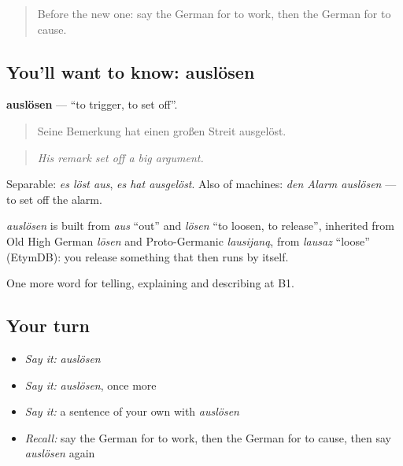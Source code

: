\begin{quote}
Before the new one: say the German for to work, then the German for to cause.
\end{quote}

\subsection*{You'll want to know: auslösen}
\textbf{auslösen} — \textquotedblleft{}to trigger, to set off\textquotedblright{}.

\begin{quote}
Seine Bemerkung hat einen großen Streit ausgelöst.
\end{quote}

\begin{quote}
\emph{His remark set off a big argument.}
\end{quote}

Separable: \emph{es löst aus}, \emph{es hat ausgelöst}. Also of machines: \emph{den Alarm auslösen} — to set off the alarm.

\begin{cousinweb}
\emph{auslösen} is built from \emph{aus} \textquotedblleft{}out\textquotedblright{} and \emph{lösen} \textquotedblleft{}to loosen, to release\textquotedblright{}, inherited from Old High German \emph{lōsen} and Proto-Germanic \emph{lausijaną}, from \emph{lausaz} \textquotedblleft{}loose\textquotedblright{} (EtymDB): you release something that then runs by itself.
\end{cousinweb}

\begin{grammarlens}[title={What you've built}]
One more word for telling, explaining and describing at B1.
\end{grammarlens}

\subsection*{Your turn}
\begin{itemize}
\raggedright
  \item \emph{Say it:} \emph{auslösen}
  \item \emph{Say it:} \emph{auslösen}, once more
  \item \emph{Say it:} a sentence of your own with \emph{auslösen}
  \item \emph{Recall:} say the German for to work, then the German for to cause, then say \emph{auslösen} again
\end{itemize}

